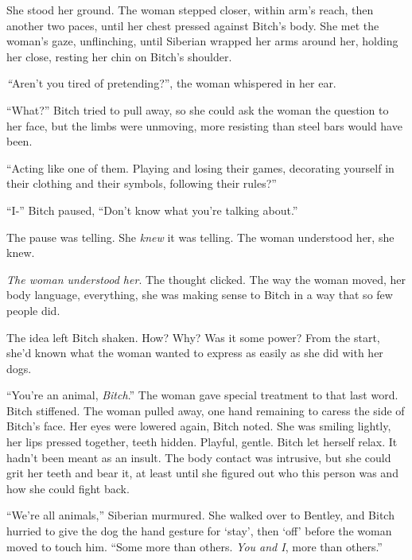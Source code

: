 She stood her ground.  The woman stepped closer, within arm's reach, then another two paces, until her chest pressed against Bitch's body.  She met the woman's gaze, unflinching, until Siberian wrapped her arms around her, holding her close, resting her chin on Bitch's shoulder.



\emph{``}Aren't you tired of pretending?'', the woman whispered in her ear.



``What?''  Bitch tried to pull away, so she could ask the woman the question to her face, but the limbs were unmoving, more resisting than steel bars would have been.



``Acting like one of them.  Playing and losing their games, decorating yourself in their clothing and their symbols, following their rules?''



``I-'' Bitch paused, ``Don't know what you're talking about.''



The pause was telling.  She \emph{knew} it was telling.  The woman understood her, she knew.



\emph{The woman understood her}.  The thought clicked.  The way the woman moved, her body language, everything, she was making sense to Bitch in a way that so few people did.



The idea left Bitch shaken.  How?  Why?  Was it some power?  From the start, she'd known what the woman wanted to express as easily as she did with her dogs.



``You're an animal, \emph{Bitch}.'' The woman gave special treatment to that last word.  Bitch stiffened.  The woman pulled away, one hand remaining to caress the side of Bitch's face.  Her eyes were lowered again, Bitch noted.  She was smiling lightly, her lips pressed together, teeth hidden.  Playful, gentle.  Bitch let herself relax.  It hadn't been meant as an insult.  The body contact was intrusive, but she could grit her teeth and bear it, at least until she figured out who this person was and how she could fight back.



``We're all animals,'' Siberian murmured.  She walked over to Bentley, and Bitch hurried to give the dog the hand gesture for `stay', then `off' before the woman moved to touch him.  ``Some more than others.  \emph{You and I}, more than others.''



